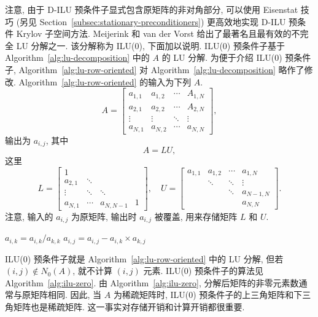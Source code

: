 {注意, 由于 D-ILU 预条件子显式包含原矩阵的非对角部分, 可以使用 Eisenstat 技巧  (另见 Section\ \ref{subsec:stationary-preconditioners}) 更高效地实现 D-ILU 预条件 Krylov 子空间方法.}
{\leavevmode{}\label{idx:chapter-03-section-05:ilu-zero-introduction}Meijerink 和 van der Vorst  给出了最著名且最有效的不完全 LU 分解之一. 该分解称为 ILU(0), 下面加以说明. ILU(0) 预条件子基于 Algorithm\ \ref{alg:lu-decomposition} 中的 $A$ 的 LU 分解. 为便于介绍 ILU(0) 预条件子, Algorithm\ \ref{alg:lu-row-oriented} 对 Algorithm\ \ref{alg:lu-decomposition} 略作了修改.}
{Algorithm\ \ref{alg:lu-row-oriented} 的输入为下列 $A$.}
\[A=\begin{bmatrix}a_{1,1}&a_{1,2}&\cdots&A_{1,N}\\a_{2,1}&a_{2,2}&\cdots&A_{2,N}\\\vdots&\vdots&\ddots&\vdots\\a_{N,1}&a_{N,2}&\cdots&a_{N,N}\end{bmatrix},\]
{输出为 $a_{i,j}$, 其中}
\[A=LU,\]
{这里}
\[L=\begin{bmatrix}1&&&\\a_{2,1}&\ddots&&\\\vdots&\ddots&\ddots&\\a_{N,1}&\cdots&a_{N,N-1}&1\end{bmatrix},\quad U=\begin{bmatrix}a_{1,1}&a_{1,2}&\cdots&a_{1,N}\\&\ddots&\ddots&\vdots\\&&\ddots&a_{N-1,N}\\&&&a_{N,N}\end{bmatrix}.\]
{注意, 输入的 $a_{i,j}$ 为原矩阵, 输出时 $a_{i,j}$ 被覆盖, 用来存储矩阵 $L$ 和 $U$.}
\begin{algorithm}[H]\caption{{LU 分解 (Algorithm\ \ref{alg:lu-decomposition} 的略微修改版本)}}\label{alg:lu-row-oriented}\begin{algorithmic}[1]
\State $a_{i,k}=a_{i,k}/a_{k,k}$
\State $a_{i,j}=a_{i,j}-a_{i,k}\times a_{k,j}$
\EndFor\EndFor\EndFor\end{algorithmic}\end{algorithm}
{ILU(0) 预条件子就是 Algorithm\ \ref{alg:lu-row-oriented} 中的 LU 分解, 但若 $(i,j)\notin N_0(A)$, 就不计算 $(i,j)$ 元素. ILU(0) 预条件子的算法见 Algorithm\ \ref{alg:ilu-zero}. 由 Algorithm\ \ref{alg:ilu-zero}, 分解后矩阵的非零元素数通常与原矩阵相同. 因此, 当 $A$ 为稀疏矩阵时, ILU(0) 预条件子的上三角矩阵和下三角矩阵也是稀疏矩阵. 这一事实对存储开销和计算开销都很重要.}

